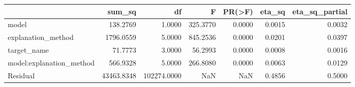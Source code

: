 \begin{tabular}{lrrrrrr}
\toprule
 & sum_sq & df & F & PR(>F) & eta_sq & eta_sq_partial \\
\midrule
model & 138.2769 & 1.0000 & 325.3770 & 0.0000 & 0.0015 & 0.0032 \\
explanation_method & 1796.0559 & 5.0000 & 845.2536 & 0.0000 & 0.0201 & 0.0397 \\
target_name & 71.7773 & 3.0000 & 56.2993 & 0.0000 & 0.0008 & 0.0016 \\
model:explanation_method & 566.9328 & 5.0000 & 266.8080 & 0.0000 & 0.0063 & 0.0129 \\
Residual & 43463.8348 & 102274.0000 & NaN & NaN & 0.4856 & 0.5000 \\
\bottomrule
\end{tabular}
